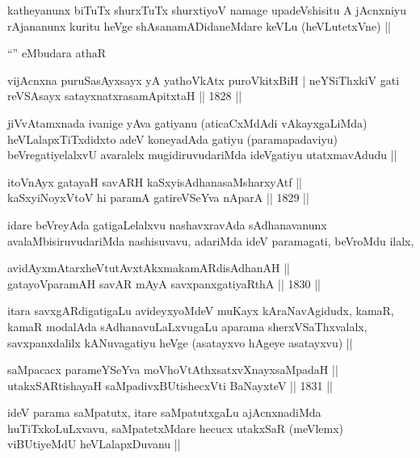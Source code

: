 \begin{artha}
katheyanunx biTuTx shurxTuTx shurxtiyoV namage upadeVshisitu A
jAcnxniyu rAjananunx kuritu heVge shAsanamADidaneMdare keVLu
(heVLutetxVne) ||
\end{artha}

``\stext'' eMbudara athaR

vijAcnxna puruSasAyxsayx yA yathoVkAtx puroVkitxBiH |
neYSiThxkiV gati reVSA\s sayx satayxnatxrasamApitxtaH || 1828 ||

\begin{artha}
jiVvAtamxnada ivanige yAva gatiyanu (aticaCxMdAdi vAkayxgaLiMda)
heVLalapxTiTxdidxto adeV koneyadAda gatiyu (paramapadaviyu)
beVregatiyelalxvU avaralelx mugidiruvudariMda ideVgatiyu utatxmavAdudu ||
\end{artha}


\begin{shl}
itoV\s nAyx gatayaH savARH kaSxyisAdhanasaMsharxyAtf ||  \\
kaSxyiNoyxV\s toV hi paramA gatireVSeYva nAparA ||  1829 ||  
\end{shl}

\begin{artha}
idare beVreyAda gatigaLelalxvu nashavxravAda sAdhanavanunx
avalaMbisiruvudariMda nashisuvavu, adariMda ideV paramagati, beVroMdu
ilalx,
\end{artha}

\begin{shl}
avidAyxmAtarxheVtutAvxtAkxmakamARdisAdhanAH || \\
gatayoV\s paramAH savAR mAyA savxpanxgatiyaRthA ||  1830 ||  
\end{shl}

\begin{artha}
itara savxgARdigatigaLu avideyxyoMdeV muKayx kAraNavAgidudx, kamaR,
kamaR modalAda sAdhanavuLaLxvugaLu aparama sherxVSaThxvalalx,
savxpanxdalilx kANuvagatiyu heVge (asatayxvo hAgeye asatayxvu) ||
\end{artha}

\begin{shl}
saMpacacx parameYSeYva moVhoVtAthxsatxvXnayxsaMpadaH || \\
utakxSARtishayaH saMpadivxBUtishecxVti BaNayxteV ||  1831 ||  
\end{shl}

\begin{artha}
ideV parama saMpatutx, itare saMpatutxgaLu ajAcnxnadiMda
huTiTxkoLuLxvavu, saMpatetxMdare hecucx utakxSaR (meVlemx) viBUtiyeMdU
heVLalapxDuvanu ||
\end{artha}

